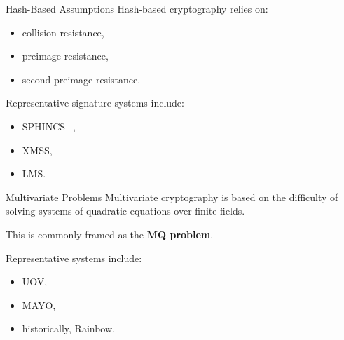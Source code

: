 \documentclass[serif, aspectratio=169]{beamer}
\begin{document}
%	
%
\begin{frame}{Hash-Based Assumptions}
	Hash-based cryptography relies on:
	\begin{itemize}
		\item collision resistance,
		\item preimage resistance,
		\item second-preimage resistance.
	\end{itemize}
	
	Representative signature systems include:
	\begin{itemize}
		\item SPHINCS+,
		\item XMSS,
		\item LMS.
	\end{itemize}
\end{frame}
%
%	
%
\begin{frame}{Multivariate Problems}
	Multivariate cryptography is based on the difficulty of solving systems of quadratic equations over finite fields.
	
	\vspace{0.5em}
	This is commonly framed as the \textbf{MQ problem}.
	
	\vspace{0.5em}
	Representative systems include:
	\begin{itemize}
		\item UOV,
		\item MAYO,
		\item historically, Rainbow.
	\end{itemize}
\end{frame}
\end{document}
